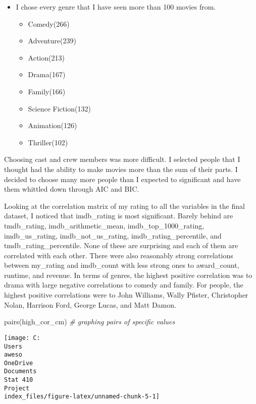 \documentclass[
]{article}
\newenvironment{Shaded}{\begin{snugshade}}{\end{snugshade}}
\newcommand{\CommentTok}[1]{\textcolor[rgb]{0.56,0.35,0.01}{\textit{#1}}}
\newcommand{\FunctionTok}[1]{\textcolor[rgb]{0.00,0.00,0.00}{#1}}
\newcommand{\NormalTok}[1]{#1}
\providecommand{\tightlist}{%
  \setlength{\itemsep}{0pt}\setlength{\parskip}{0pt}}
\begin{document}
\begin{itemize}
\tightlist
\item
  I chose every genre that I have seen more than 100 movies from.

  \begin{itemize}
  \tightlist
  \item
    Comedy(266)
  \item
    Adventure(239)
  \item
    Action(213)
  \item
    Drama(167)
  \item
    Family(166)
  \item
    Science Fiction(132)
  \item
    Animation(126)
  \item
    Thriller(102)
  \end{itemize}
\end{itemize}

Choosing cast and crew members was more difficult. I selected people
that I thought had the ability to make movies more than the sum of their
parts. I decided to choose many more people than I expected to
significant and have them whittled down through AIC and BIC.

Looking at the correlation matrix of my rating to all the variables in
the final dataset, I noticed that imdb\_rating is most significant.
Barely behind are tmdb\_rating, imdb\_arithmetic\_mean,
imdb\_top\_1000\_rating, imdb\_us\_rating, imdb\_not\_us\_rating,
imdb\_rating\_percentile, and tmdb\_rating\_percentile. None of these
are surprising and each of them are correlated with each other. There
were also reasonably strong correlations between my\_rating and
imdb\_count with less strong ones to award\_count, runtime, and revenue.
In terms of genres, the highest positive correlation was to drama with
large negative correlations to comedy and family. For people, the
highest positive correlations were to John Williams, Wally Pfister,
Christopher Nolan, Harrison Ford, George Lucas, and Matt Damon.

\begin{Shaded}
\begin{Highlighting}[]
\FunctionTok{pairs}\NormalTok{(high\_cor\_cm) }\CommentTok{\# graphing pairs of specific values}
\end{Highlighting}
\end{Shaded}

\texttt{[image: C:\\Users\\aweso\\OneDrive\\Documents\\Stat 410\\Project\\index\_files/figure-latex/unnamed-chunk-5-1]}
\end{document}

